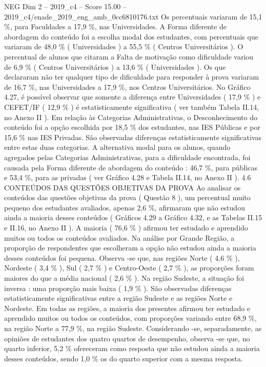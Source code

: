 \begin{textsample}{NEG Dim 2 – 2019\_c4 – Score 15.00 – 2019\_c4/enade\_2019\_eng\_amb\_0cc6810176.txt}
Os percentuais variaram de 15,1 \%, para Faculdades a 17,9 \%, nas Universidades.
A Forma diferente de abordagem do conteúdo foi a escolha modal dos estudantes, com percentuais que variaram de 48,0 \% ( Universidades ) a 55,5 \% ( Centros Universitários ).
O percentual de alunos que citaram a Falta de motivação como dificuldade variou de 6,9 \% ( Centros Universitários ) a 13,6 \% ( Universidades ).
Os que declararam não ter qualquer tipo de dificuldade para responder à prova variaram de 16,7 \%, nas Universidades a 17,9 \%, nos Centros Universitários.
No Gráfico 4.27, é possível observar que somente a diferença entre Universidades ( 17,9 \% ) e CEFET/IF ( 12,9 \% ) é estatisticamente significativa ( ver também Tabela II.14, no Anexo II ).
Em relação às Categorias Administrativas, o Desconhecimento do conteúdo foi a opção escolhida por 18,5 \% dos estudantes, nas IES Públicas e por 15,6 \% nas IES Privadas.
São observadas diferenças estatisticamente significativas entre estas duas categorias.
A alternativa modal para os alunos, quando agregados pelas Categorias Administrativas, para a dificuldade encontrada, foi causada pela Forma diferente de abordagem do conteúdo : 46,7 \%, para públicas e 53,4 \%, para as privadas ( ver Gráfico 4.28 e Tabela II.14, no Anexo II ). 4.6 CONTEÚDOS DAS QUESTÕES OBJETIVAS DA PROVA Ao analisar os conteúdos das questões objetivas da prova ( Questão 8 ), um percentual muito pequeno dos estudantes avaliados, apenas 2,6 \%, afirmaram que não estudou ainda a maioria desses conteúdos ( Gráficos 4.29 a Gráfico 4.32, e as Tabelas II.15 e II.16, no Anexo II ).
A maioria ( 76,6 \% ) afirmou ter estudado e aprendido muitos ou todos os conteúdos avaliados.
Na análise por Grande Região, a proporção de respondentes que escolheram a opção não estudou ainda a maioria desses conteúdos foi pequena.
Observa -se que, nas regiões Norte ( 4,6 \% ), Nordeste ( 3,4 \% ), Sul ( 2,7 \% ) e Centro-Oeste ( 2,7 \% ), as proporções foram maiores do que a média nacional ( 2,6 \% ).
Na região Sudeste, a situação foi inversa : uma proporção mais baixa ( 1,9 \% ).
São observadas diferenças estatisticamente significativas entre a região Sudeste e as regiões Norte e Nordeste.
Em todas as regiões, a maioria dos presentes afirmou ter estudado e aprendido muitos ou todos os conteúdos, com proporções variando entre 68,9 \%, na região Norte a 77,9 \%, na região Sudeste.
Considerando -se, separadamente, as opiniões de estudantes dos quatro quartos de desempenho, observa -se que, no quarto inferior, 5,2 \% ofereceram como resposta que não estudou ainda a maioria desses conteúdos, sendo 1,0 \% os do quarto superior com a mesma resposta.

\end{textsample}
